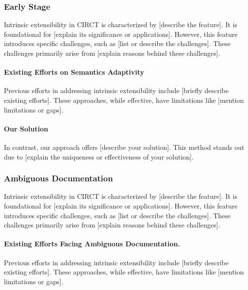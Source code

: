 \subsubsection{Early Stage}
 
Intrinsic extensibility in CIRCT is characterized by [describe the feature]. It is foundational for [explain its significance or applications].
However, this feature introduces specific challenges, such as [list or describe the challenges]. These challenges primarily arise from [explain reasons behind these challenges]. 

\paragraph{Existing Efforts on Semantics Adaptivity}
\ToWrite{}
Previous efforts in addressing intrinsic extensibility include [briefly describe existing efforts]. These approaches, while effective, have limitations like [mention limitations or gaps].

\paragraph{Our Solution}
\ToWrite{}
In contrast, our approach offers [describe your solution]. This method stands out due to [explain the uniqueness or effectiveness of your solution]. 

\subsubsection{Ambiguous Documentation}
Intrinsic extensibility in CIRCT is characterized by [describe the feature]. It is foundational for [explain its significance or applications].
However, this feature introduces specific challenges, such as [list or describe the challenges]. These challenges primarily arise from [explain reasons behind these challenges].

\paragraph{Existing Efforts Facing Ambiguous Documentation.}
\ToWrite{}
Previous efforts in addressing intrinsic extensibility include [briefly describe existing efforts]. These approaches, while effective, have limitations like [mention limitations or gaps].

